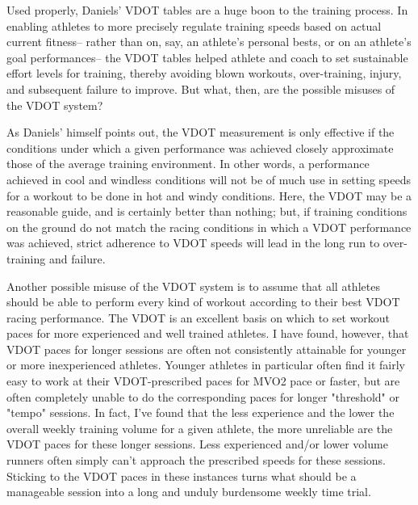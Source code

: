 Used properly, Daniels' VDOT tables are a huge boon to the training process. In enabling athletes to more precisely regulate training speeds based on actual current fitness-- rather than on, say, an athlete's personal bests, or on an athlete's goal performances-- the VDOT tables helped athlete and coach to set sustainable effort levels for training, thereby avoiding blown workouts, over-training, injury, and subsequent failure to improve. But what, then, are the possible misuses of the VDOT system?

As Daniels' himself points out, the VDOT measurement is only effective if the conditions under which a given performance was achieved closely approximate those of the average training environment. In other words, a performance achieved in cool and windless conditions will not be of much use in setting speeds for a workout to be done in hot and windy conditions. Here, the VDOT may be a reasonable guide, and is certainly better than nothing; but, if training conditions on the ground do not match the racing conditions in which a VDOT performance was achieved, strict adherence to VDOT speeds will lead in the long run to over-training and failure.

Another possible misuse of the VDOT system is to assume that all athletes should be able to perform every kind of workout according to their best VDOT racing performance. The VDOT is an excellent basis on which to set workout paces for more experienced and well trained athletes. I have found, however, that VDOT paces for longer sessions are often not consistently attainable for younger or more inexperienced athletes. Younger athletes in particular often find it fairly easy to work at their VDOT-prescribed paces for MVO2 pace or faster, but are often completely unable to do the corresponding paces for longer "threshold" or "tempo" sessions. In fact, I've found that the less experience and the lower the overall weekly training volume for a given athlete, the more unreliable are the VDOT paces for these longer sessions. Less experienced and/or lower volume runners often simply can't approach the prescribed speeds for these sessions. Sticking to the VDOT paces in these instances turns what should be a manageable session into a long and unduly burdensome weekly time trial.


